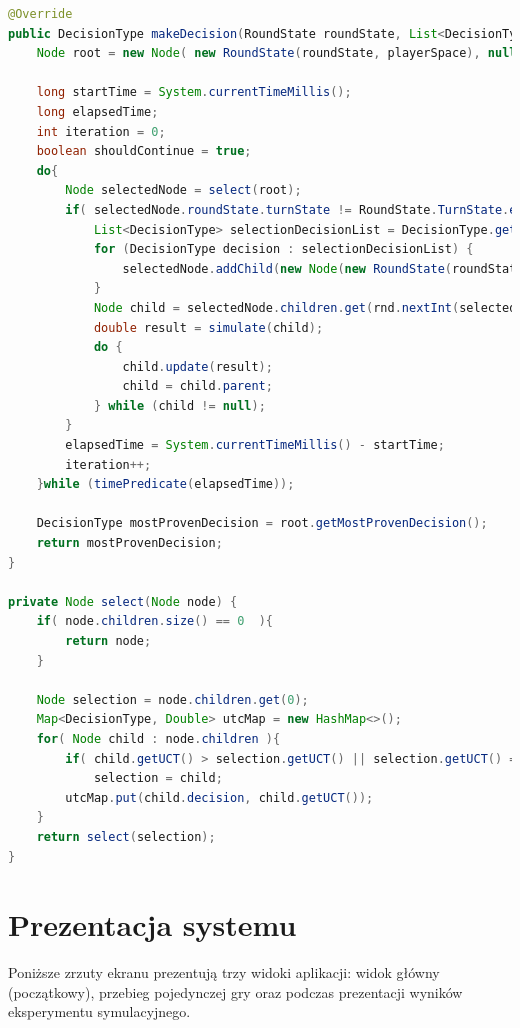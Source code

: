 \begin{lstlisting}[language=java,label=lst:mcts,caption=Wybrane metody klasy MctsAlgorithm, breaklines=true]
@Override
public DecisionType makeDecision(RoundState roundState, List<DecisionType> decisionList) {
	Node root = new Node( new RoundState(roundState, playerSpace), null );
	
	long startTime = System.currentTimeMillis();
	long elapsedTime;
	int iteration = 0;
	boolean shouldContinue = true;
	do{
		Node selectedNode = select(root);
		if( selectedNode.roundState.turnState != RoundState.TurnState.ended ) {
			List<DecisionType> selectionDecisionList = DecisionType.getDecisions(selectedNode.roundState.spaceOfFirstPlayer.hand);
			for (DecisionType decision : selectionDecisionList) {
				selectedNode.addChild(new Node(new RoundState(roundState, roundState.spaceOfFirstPlayer), decision));
			}
			Node child = selectedNode.children.get(rnd.nextInt(selectedNode.children.size()));
			double result = simulate(child);
			do {
				child.update(result);
				child = child.parent;
			} while (child != null);
		}
		elapsedTime = System.currentTimeMillis() - startTime;
		iteration++;
	}while (timePredicate(elapsedTime));
	
	DecisionType mostProvenDecision = root.getMostProvenDecision();
	return mostProvenDecision;
}
    
private Node select(Node node) {
	if( node.children.size() == 0  ){
		return node;
	}
	
	Node selection = node.children.get(0);
	Map<DecisionType, Double> utcMap = new HashMap<>();
	for( Node child : node.children ){
		if( child.getUCT() > selection.getUCT() || selection.getUCT() == 0 )
			selection = child;
		utcMap.put(child.decision, child.getUCT());
	}
	return select(selection);
}

\end{lstlisting}
\clearpage

\section{Prezentacja systemu}
Poniższe zrzuty ekranu prezentują trzy widoki aplikacji: widok główny  (początkowy), przebieg pojedynczej gry oraz podczas prezentacji wyników eksperymentu symulacyjnego.

